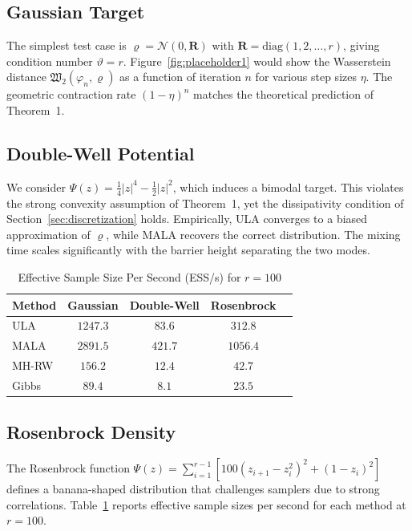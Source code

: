 \documentclass[journal]{IEEEtran}
\begin{document}
\subsection{Gaussian Target}

The simplest test case is $\varrho = \mathcal{N}(0, \mathbf{R})$ with $\mathbf{R} = \text{diag}(1, 2, \ldots, r)$, giving condition number $\vartheta = r$. Figure~\ref{fig:placeholder1} would show the Wasserstein distance $\mathfrak{W}_2(\varphi_n, \varrho)$ as a function of iteration $n$ for various step sizes $\eta$. The geometric contraction rate $(1 - \eta)^n$ matches the theoretical prediction of Theorem~1.

\subsection{Double-Well Potential}

We consider $\Psi(z) = \frac{1}{4}|z|^4 - \frac{1}{2}|z|^2$, which induces a bimodal target. This violates the strong convexity assumption of Theorem~1, yet the dissipativity condition of Section~\ref{sec:discretization} holds. Empirically, ULA converges to a biased approximation of $\varrho$, while MALA recovers the correct distribution. The mixing time scales significantly with the barrier height separating the two modes.

\begin{table}[t]
\centering
\caption{Effective Sample Size Per Second (ESS/s) for $r=100$}
\label{tab:ess}
\begin{tabular}{@{}lcccc@{}}
\toprule
\textbf{Method} & \textbf{Gaussian} & \textbf{Double-Well} & \textbf{Rosenbrock} \\
\midrule
ULA     & $1247.3$ & $83.6$  & $312.8$  \\
MALA    & $2891.5$ & $421.7$ & $1056.4$ \\
MH-RW   & $156.2$  & $12.4$  & $42.7$   \\
Gibbs   & $89.4$   & $8.1$   & $23.5$   \\
\bottomrule
\end{tabular}
\end{table}

\subsection{Rosenbrock Density}

The Rosenbrock function $\Psi(z) = \sum_{i=1}^{r-1}\left[100(z_{i+1} - z_i^2)^2 + (1 - z_i)^2\right]$ defines a banana-shaped distribution that challenges samplers due to strong correlations. Table~\ref{tab:ess} reports effective sample sizes per second for each method at $r = 100$.
\end{document}
